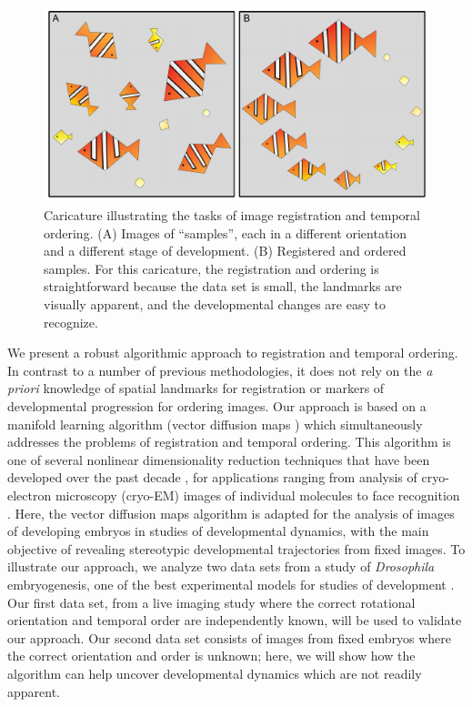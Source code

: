 \documentclass{pnastwo}
\makeatletter
\newcommand{\customlabel}[2]{%
\protected@write \@auxout {}{\string \newlabel {#1}{{#2}{}}}}
\makeatother
\begin{document}
\begin{article}
\begin{figure}[t]
\includegraphics{fig1}
\caption{Caricature illustrating the tasks of image registration and temporal ordering. {\xfigtextfontit (A)} Images of ``samples'', each in a different orientation and a different stage of development. {\xfigtextfontit (B)} Registered and ordered samples. For this caricature, the registration and ordering is straightforward because the data set is small, the landmarks are visually apparent, and the developmental changes are easy to recognize.}
\customlabel{fig:fish}{1}
\customlabel{subfig:fish_unordered}{\ref{fig:fish}{\it A}}
\customlabel{subfig:fish_ordered}{\ref{fig:fish}{\it B}}
\end{figure}


We present a robust algorithmic approach to registration and temporal ordering.
%
In contrast to a number of previous methodologies, it does not rely on the {\em a priori} knowledge of spatial landmarks for registration or markers of developmental progression for ordering images\cite{zitova2003image, rowley1998rotation, hajnal2010medical, greenspan1994rotation, zhao2003face}.
%
Our approach is based on a manifold learning algorithm (vector diffusion maps \cite{singer2012vector}) which simultaneously addresses the problems of registration and temporal ordering. 
%
This algorithm is one of several nonlinear dimensionality reduction techniques that have been developed over the past decade \cite{Belkin2003, coifman2005geometric, coifman2006geometric, tenenbaum2000global, roweis2000nonlinear}, for
applications ranging from analysis of cryo-electron microscopy (cryo-EM) images of individual molecules  \cite{zhao2014rotationally, singer2011viewing} to face recognition \cite{lafon2006data}.
%
Here, the vector diffusion maps algorithm is adapted for the analysis of images of developing embryos in studies of developmental dynamics, with the main objective of revealing stereotypic developmental trajectories from fixed images.
%
To illustrate our approach, we analyze two data sets from a study of {\it Drosophila} embryogenesis, one of the best experimental models for studies of development \cite{jaeger2012drosophila}.
%
Our first data set, from a live imaging study where the correct rotational orientation and temporal order are independently known, will be used to validate our approach.
%
Our second data set consists of images from fixed embryos where the correct orientation and order is unknown; here, we will show how the algorithm can help uncover developmental dynamics which are not readily apparent. 



\end{article}
\end{document}
